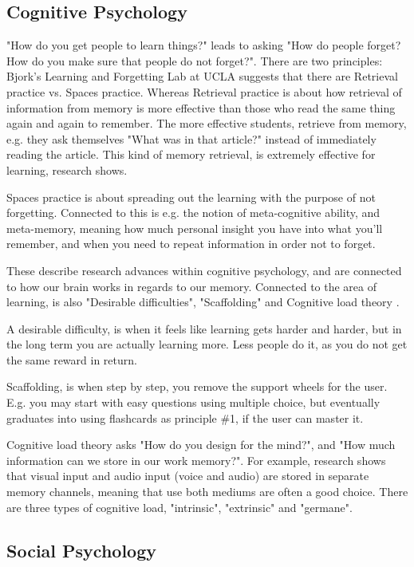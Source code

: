 \subsection{Cognitive Psychology}
"How do you get people to learn things?" leads to asking "How do people forget? How do you make sure that people do not forget?". There are two principles: Bjork's Learning and Forgetting Lab at UCLA\citep{learning-ucla} suggests that there are Retrieval practice vs. Spaces practice. Whereas Retrieval practice is about how retrieval of information from memory is more effective than those who read the same thing again and again to remember. The more effective students, retrieve from memory, e.g. they ask themselves "What was in that article?" instead of immediately reading the article. This kind of memory retrieval, is extremely effective for learning, research shows.

Spaces practice is about spreading out the learning with the purpose of not forgetting. Connected to this is e.g. the notion of meta-cognitive ability, and meta-memory, meaning how much personal insight you have into what you'll remember, and when you need to repeat information in order not to forget.

These describe research advances within cognitive psychology, and are connected to how our brain works in regards to our memory. Connected to the area of learning, is also "Desirable difficulties", "Scaffolding" and Cognitive load theory \citep{effectivelearning-lab}.

A desirable difficulty, is when it feels like learning gets harder and harder, but in the long term you are actually learning more. Less people do it, as you do not get the same reward in return.

Scaffolding, is when step by step, you remove the support wheels for the user. E.g. you may start with easy questions using multiple choice, but eventually graduates into using flashcards as principle \#1, if the user can master it.

Cognitive load theory asks "How do you design for the mind?", and "How much information can we store in our work memory?". For example, research shows that visual input and audio input (voice and audio) are stored in separate memory channels, meaning that use both mediums are often a good choice. There are three types of cognitive load, "intrinsic", "extrinsic" and "germane".



\subsection{Social Psychology}

